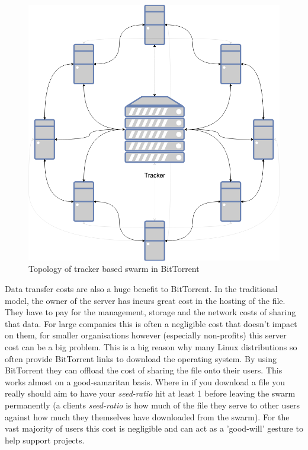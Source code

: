 \begin{figure}
	\begin{center}
		\includegraphics[scale=0.3]{diagrams/bittorrent}
		\caption{Topology of tracker based swarm in BitTorrent}
		\label{fig:bittorrent-tracker}
	\end{center}
\end{figure}

Data transfer costs are also a huge benefit to BitTorrent. In the traditional model, the owner of the server has incurs great cost in the hosting of the file. They have to pay for the management, storage and the network costs of sharing that data. For large companies this is often a negligible cost that doesn't impact on them, for smaller organisations however (especially non-profits) this server cost can be a big problem. This is a big reason why many Linux distributions so often provide BitTorrent links to download the operating system. By using BitTorrent they can offload the cost of sharing the file onto their users. This works almost on a good-samaritan basis. Where in if you download a file you really should aim to have your \textit{seed-ratio} hit at least 1 before leaving the swarm permanently (a clients \textit{seed-ratio} is how much of the file they serve to other users against how much they themselves have downloaded from the swarm). For the vast majority of users this cost is negligible and can act as a 'good-will' gesture to help support projects.

